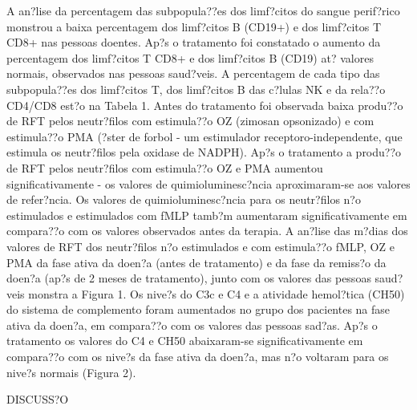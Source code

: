 \documentclass[12pt]{article}
\begin{document}
 A an?lise da percentagem das subpopula??es dos limf?citos do sangue
perif?rico monstrou a baixa percentagem dos limf?citos B (CD19+) e dos
limf?citos T CD8+ nas pessoas doentes. Ap?s o tratamento foi constatado o
aumento da percentagem dos limf?citos T CD8+ e dos limf?citos B (CD19)
at? valores normais, observados nas pessoas saud?veis. A percentagem de
cada tipo das subpopula??es dos limf?citos T, dos limf?citos B das
c?lulas NK e da rela??o CD4/CD8 est?o na Tabela 1.
 Antes do tratamento foi observada baixa produ??o de RFT pelos
neutr?filos com estimula??o OZ (zimosan opsonizado) e com estimula??o PMA
(?ster de forbol - um estimulador receptoro-independente, que estimula os
neutr?filos pela oxidase de NADPH). Ap?s o tratamento a produ??o de RFT
pelos neutr?filos com estimula??o OZ e PMA aumentou significativamente -
os valores de quimioluminesc?ncia aproximaram-se aos valores de
refer?ncia. Os valores de quimioluminesc?ncia  para os neutr?filos n?o
estimulados e estimulados com fMLP tamb?m aumentaram significativamente em
compara??o com os valores observados antes da terapia. A an?lise das
m?dias dos valores de RFT dos neutr?filos n?o estimulados e com estimula??o
fMLP, OZ e PMA da fase ativa da doen?a (antes de tratamento) e da fase
da remiss?o da doen?a (ap?s de 2 meses de tratamento), junto com os
valores das pessoas saud?veis monstra a Figura 1.
 Os nive?s do C3c e C4 e a atividade hemol?tica (CH50) do sistema de
complemento foram aumentados no grupo dos pacientes na fase ativa da
doen?a, em compara??o com os valores das pessoas sad?as. Ap?s o tratamento
os valores do C4 e CH50 abaixaram-se significativamente em compara??o
com os nive?s da fase ativa da doen?a, mas n?o voltaram para os nive?s
normais (Figura 2).

 DISCUSS?O
\end{document}
